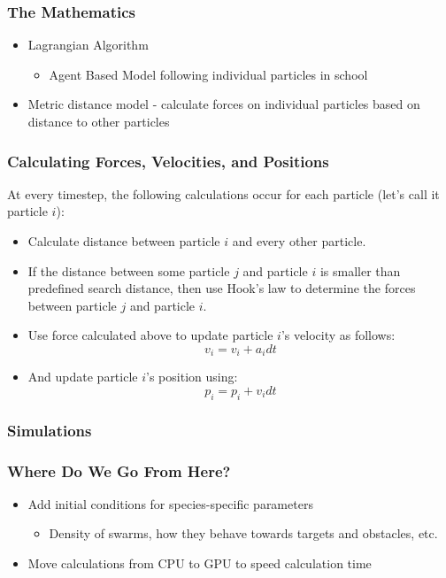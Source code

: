 \documentclass[xcolor=dvipsnames]{beamer}
\begin{document}
\begin{frame}
	\frametitle{The Mathematics}
	\begin{itemize}
		\item Lagrangian Algorithm
		\begin{itemize}
			\item Agent Based Model following individual particles in school
		\end{itemize}
		\item Metric distance model - calculate forces on individual particles based on distance to other particles
	\end{itemize}
\end{frame}

\begin{frame}
	\frametitle{Calculating Forces, Velocities, and Positions}
	At every timestep, the following calculations occur for each particle (let's call it particle $i$):
	\pause
	\begin{itemize}
		\item Calculate distance between particle $i$ and every other particle. \pause
		\item If the distance between some particle $j$ and particle $i$ is smaller than predefined search distance, then use Hook's law to determine the forces between particle $j$ and particle $i$. \pause
		\item Use force calculated above to update particle $i$'s velocity as follows: \pause
			\begin{equation*}
				v_{i} = v_{i} + a_{i}dt
			\end{equation*} \pause
		\item And update particle $i$'s position using: \pause
			\begin{equation*}
				p_{i} = p_{i} + v_{i}dt	
			\end{equation*}

		
	\end{itemize}
\end{frame}

\begin{frame}
	\frametitle{Simulations}
\end{frame}

\begin{frame}
	\frametitle{Where Do We Go From Here?}
	\begin{itemize}
		\item Add initial conditions for species-specific parameters 
			\begin{itemize}
				\item Density of swarms, how they behave towards targets and obstacles, etc.
			\end{itemize}
		\item Move calculations from CPU to GPU to speed calculation time
	\end{itemize}
\end{frame}
\end{document}
